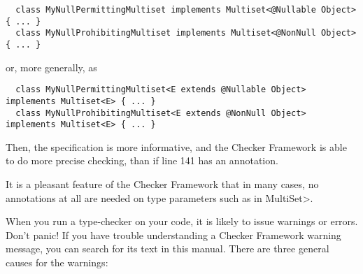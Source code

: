 \begin{Verbatim}
  class MyNullPermittingMultiset implements Multiset<@Nullable Object> { ... }
  class MyNullProhibitingMultiset implements Multiset<@NonNull Object> { ... }
\end{Verbatim}

\noindent
or, more generally, as

\begin{Verbatim}
  class MyNullPermittingMultiset<E extends @Nullable Object> implements Multiset<E> { ... }
  class MyNullProhibitingMultiset<E extends @NonNull Object> implements Multiset<E> { ... }
\end{Verbatim}

Then, the specification is more informative, and the Checker Framework is
able to do more precise checking, than if line 141 has an annotation.

It is a pleasant feature of the Checker Framework that in many cases, no
annotations at all are needed on type parameters such as  in \<MultiSet>.



When you run a type-checker on your code, it is likely to issue warnings or
errors.  Don't panic!
If you have trouble understanding a Checker Framework warning message, you
can search for its text in this manual.
There are three general causes for the warnings:

